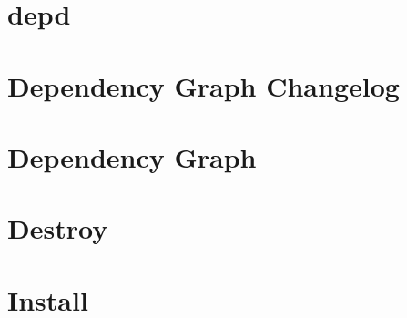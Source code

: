 \documentclass[twoside]{book}
\newcommand{\+}{\discretionary{\mbox{\scriptsize$\hookleftarrow$}}{}{}}
\begin{document}
\chapter{depd}
\label{md__c___users_vaishnavi_jadhav__desktop__developer_code_mean_stack_example_client_node_modules_depd__readme}

\chapter{Dependency Graph Changelog}
\label{md__c___users_vaishnavi_jadhav__desktop__developer_code_mean_stack_example_client_node_modules_d59cc729b4296e747790b93793284810d}

\chapter{Dependency Graph}
\label{md__c___users_vaishnavi_jadhav__desktop__developer_code_mean_stack_example_client_node_modules_dependency_graph__r_e_a_d_m_e}

\chapter{Destroy}
\label{md__c___users_vaishnavi_jadhav__desktop__developer_code_mean_stack_example_client_node_modules_destroy__r_e_a_d_m_e}

\chapter{Install}
\label{md__c___users_vaishnavi_jadhav__desktop__developer_code_mean_stack_example_client_node_modules_detect_node__readme}

\end{document}
